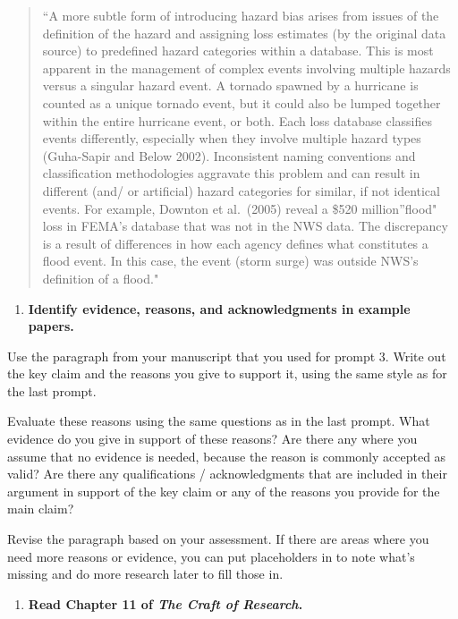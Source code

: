 \documentclass[]{tufte-book}
\providecommand{\tightlist}{%
  \setlength{\itemsep}{0pt}\setlength{\parskip}{0pt}}
\begin{document}
\begin{quote}
``A more subtle form of introducing hazard bias arises from issues of the
definition of the hazard and assigning loss estimates (by the original data
source) to predefined hazard categories within a database. This is most apparent
in the management of complex events involving multiple hazards versus a singular
hazard event. A tornado spawned by a hurricane is counted as a unique tornado
event, but it could also be lumped together within the entire hurricane event,
or both. Each loss database classifies events differently, especially when they
involve multiple hazard types (Guha-Sapir and Below 2002). Inconsistent naming
conventions and classification methodologies aggravate this problem and can
result in different (and/ or artificial) hazard categories for similar, if not
identical events. For example, Downton et al.~(2005) reveal a \$520 million''flood" loss in FEMA's database that was not in the NWS data. The discrepancy is
a result of differences in how each agency defines what constitutes a flood
event. In this case, the event (storm surge) was outside NWS's definition of a
flood."
\end{quote}

\begin{enumerate}
\def\labelenumi{\arabic{enumi}.}
\setcounter{enumi}{5}
\tightlist
\item
  \textbf{Identify evidence, reasons, and acknowledgments in example papers.}
\end{enumerate}

Use the paragraph from your manuscript that you used for prompt 3. Write out
the key claim and the reasons you give to support it, using the same style as
for the last prompt.

Evaluate these reasons using the same questions as in the last prompt. What
evidence do you give in support of these reasons? Are there any where you assume
that no evidence is needed, because the reason is commonly accepted as valid?
Are there any qualifications / acknowledgments that are included in their
argument in support of the key claim or any of the reasons you provide for the
main claim?

Revise the paragraph based on your assessment. If there are areas where you need
more reasons or evidence, you can put placeholders in to note what's missing and
do more research later to fill those in.

\begin{enumerate}
\def\labelenumi{\arabic{enumi}.}
\setcounter{enumi}{6}
\tightlist
\item
  \textbf{Read Chapter 11 of \emph{The Craft of Research}.}
\end{enumerate}
\end{document}
